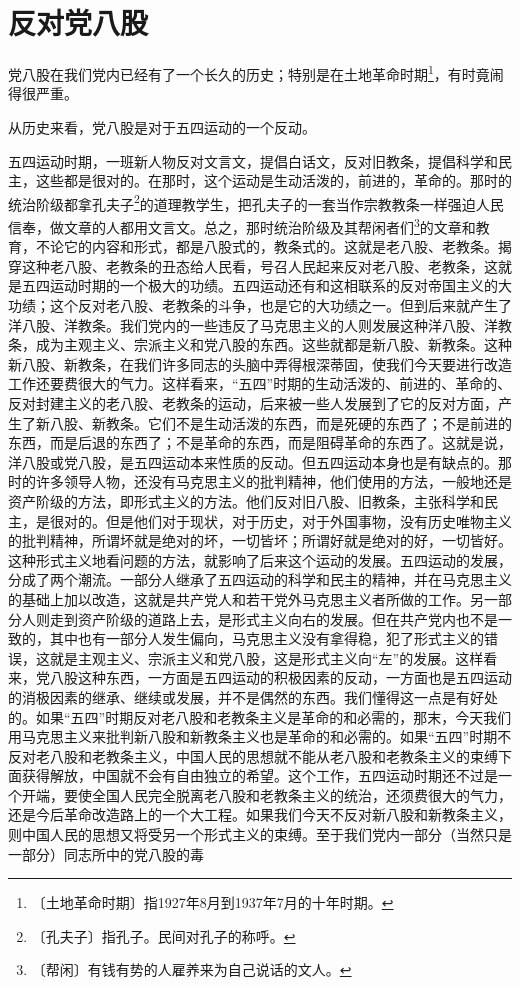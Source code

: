 \documentclass[12pt,UTF-8,openany]{ctexbook}
\begin{document}
\chapter{反对党八股}

\begin{normalsize}
    
    党八股在我们党内已经有了一个长久的历史；特别是在土地革命时期\footnote{〔土地革命时期〕指1927年8月到1937年7月的十年时期。}，有时竟闹得很严重。
    
    从历史来看，党八股是对于五四运动的一个反动。
    
    五四运动时期，一班新人物反对文言文，提倡白话文，反对旧教条，提倡科学和民主，这些都是很对的。在那时，这个运动是生动活泼的，前进的，革命的。那时的统治阶级都拿孔夫子\footnote{〔孔夫子〕指孔子。民间对孔子的称呼。}的道理教学生，把孔夫子的一套当作宗教教条一样强迫人民信奉，做文章的人都用文言文。总之，那时统治阶级及其帮闲者们\footnote{〔帮闲〕有钱有势的人雇养来为自己说话的文人。}的文章和教育，不论它的内容和形式，都是八股式的，教条式的。这就是老八股、老教条。揭穿这种老八股、老教条的丑态给人民看，号召人民起来反对老八股、老教条，这就是五四运动时期的一个极大的功绩。五四运动还有和这相联系的反对帝国主义的大功绩；这个反对老八股、老教条的斗争，也是它的大功绩之一。但到后来就产生了洋八股、洋教条。我们党内的一些违反了马克思主义的人则发展这种洋八股、洋教条，成为主观主义、宗派主义和党八股的东西。这些就都是新八股、新教条。这种新八股、新教条，在我们许多同志的头脑中弄得根深蒂固，使我们今天要进行改造工作还要费很大的气力。这样看来，“五四”时期的生动活泼的、前进的、革命的、反对封建主义的老八股、老教条的运动，后来被一些人发展到了它的反对方面，产生了新八股、新教条。它们不是生动活泼的东西，而是死硬的东西了；不是前进的东西，而是后退的东西了；不是革命的东西，而是阻碍革命的东西了。这就是说，洋八股或党八股，是五四运动本来性质的反动。但五四运动本身也是有缺点的。那时的许多领导人物，还没有马克思主义的批判精神，他们使用的方法，一般地还是资产阶级的方法，即形式主义的方法。他们反对旧八股、旧教条，主张科学和民主，是很对的。但是他们对于现状，对于历史，对于外国事物，没有历史唯物主义的批判精神，所谓坏就是绝对的坏，一切皆坏；所谓好就是绝对的好，一切皆好。这种形式主义地看问题的方法，就影响了后来这个运动的发展。五四运动的发展，分成了两个潮流。一部分人继承了五四运动的科学和民主的精神，并在马克思主义的基础上加以改造，这就是共产党人和若干党外马克思主义者所做的工作。另一部分人则走到资产阶级的道路上去，是形式主义向右的发展。但在共产党内也不是一致的，其中也有一部分人发生偏向，马克思主义没有拿得稳，犯了形式主义的错误，这就是主观主义、宗派主义和党八股，这是形式主义向“左”的发展。这样看来，党八股这种东西，一方面是五四运动的积极因素的反动，一方面也是五四运动的消极因素的继承、继续或发展，并不是偶然的东西。我们懂得这一点是有好处的。如果“五四”时期反对老八股和老教条主义是革命的和必需的，那末，今天我们用马克思主义来批判新八股和新教条主义也是革命的和必需的。如果“五四”时期不反对老八股和老教条主义，中国人民的思想就不能从老八股和老教条主义的束缚下面获得解放，中国就不会有自由独立的希望。这个工作，五四运动时期还不过是一个开端，要使全国人民完全脱离老八股和老教条主义的统治，还须费很大的气力，还是今后革命改造路上的一个大工程。如果我们今天不反对新八股和新教条主义，则中国人民的思想又将受另一个形式主义的束缚。至于我们党内一部分（当然只是一部分）同志所中的党八股的毒
\end{normalsize}
\end{document}
